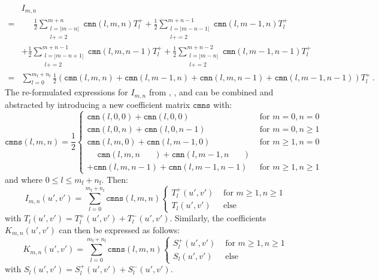 \begin{align}
  ~& I_{m,n} \\
  =& \phantom{+}~ \frac{1}{2} \sum_{\substack{l=|m-n|\\l+=2}}^{m+n}     \mathtt{cmn}(l,m,n) T^{+}_l
              +   \frac{1}{2} \sum_{\substack{l=|m-n-1|\\l+=2}}^{m+n-1} \mathtt{cmn}(l,m-1,n) T^{+}_l \nonumber \\
           ~& +   \frac{1}{2} \sum_{\substack{l=|m-n+1|\\l+=2}}^{m+n-1} \mathtt{cmn}(l,m,n-1) T^{+}_l
              +   \frac{1}{2} \sum_{\substack{l=|m-n|\\l+=2}}^{m+n-2}   \mathtt{cmn}(l,m-1,n-1) T^{+}_l \\
  =& \sum_{l=0}^{m_\mathrm{f}+n_\mathrm{f}}
     \frac{1}{2} \left( \mathtt{cmn}(l,m,n) + \mathtt{cmn}(l,m-1,n) + \mathtt{cmn}(l,m,n-1) + \mathtt{cmn}(l,m-1,n-1) \right) T^{+}_l \, . \label{eqn:I_mn}
\end{align}
The re-formulated expressions for $I_{m,n}$ from , ,  and 
can be combined and abstracted by introducing a new coefficient matrix $\mathtt{cmns}$ with:
\begin{equation}
  \mathtt{cmns}(l,m,n) = \frac{1}{2}
  \begin{cases}
    \mathtt{cmn}(l,0,0) + \mathtt{cmn}(l,0,0)                                               & \textrm{ for } m=0, n=0 \\
    \mathtt{cmn}(l,0,n) + \mathtt{cmn}(l,0,n-1)                                             & \textrm{ for } m=0, n \geq 1 \\
    \mathtt{cmn}(l,m,0) + \mathtt{cmn}(l,m-1,0)                                             & \textrm{ for } m \geq 1, n=0 \\
    \phantom{+} \mathtt{cmn}(l,m,n \phantom{-1}~\,) + \mathtt{cmn}(l,m-1,n \phantom{-1}~\,) & ~ \\
             +  \mathtt{cmn}(l,m,n          -1    ) + \mathtt{cmn}(l,m-1,n          -1    ) & \textrm{ for } m \geq 1, n \geq 1
  \end{cases}
\end{equation}
and where $0 \leq l \leq m_\mathrm{f}+n_\mathrm{f}$.
Then:
\begin{equation}
  I_{m,n}(u',v') = \sum_{l=0}^{m_\mathrm{f}+n_\mathrm{f}} \mathtt{cmns}(l,m,n)
  \begin{cases}
    T^{+}_l(u',v') & \textrm{ for } m \geq 1, n \geq 1 \\
    T_l    (u',v') & \textrm{ else}
  \end{cases}
\end{equation}
with $T_l(u',v') = T^{+}_l(u',v') + T^{-}_l(u',v')$.
Similarly, the coefficients $K_{m,n}(u',v')$ can then be expressed as follows:
\begin{equation}
  K_{m,n}(u',v') = \sum_{l=0}^{m_\mathrm{f}+n_\mathrm{f}} \mathtt{cmns}(l,m,n)
  \begin{cases}
    S^{+}_l(u',v') & \textrm{ for } m \geq 1, n \geq 1 \\
    S_l    (u',v') & \textrm{ else}
  \end{cases}
\end{equation}
with $S_l(u',v') = S^{+}_l(u',v') + S^{-}_l(u',v')$.

